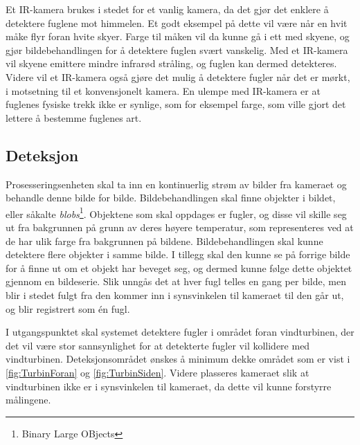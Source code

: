 Et IR-kamera brukes i stedet for et vanlig kamera, da det gjør det enklere å detektere fuglene mot himmelen. 
Et godt eksempel på dette vil være når en hvit måke flyr foran hvite skyer. 
Farge til måken vil da kunne gå i ett med skyene, og gjør bildebehandlingen for å detektere fuglen svært vanskelig. 
Med et IR-kamera vil skyene emittere mindre infrarød stråling, og fuglen kan dermed detekteres. 
Videre vil et IR-kamera også gjøre det mulig å detektere fugler når det er mørkt, i motsetning til et konvensjonelt kamera. 
En ulempe med IR-kamera er at fuglenes fysiske trekk ikke er synlige, som for eksempel farge, som ville gjort det lettere å bestemme fuglenes art. 

\subsection{Deteksjon}\label{sec:design:deteksjon}

Prosesseringsenheten skal ta inn en kontinuerlig strøm av bilder fra kameraet og behandle denne bilde for bilde. 
Bildebehandlingen skal finne objekter i bildet, eller såkalte \textit{blobs}\footnote{Binary Large OBjects}. 
Objektene som skal oppdages er fugler, og disse vil skille seg ut fra bakgrunnen på grunn av deres høyere temperatur, som representeres ved at de har ulik farge fra bakgrunnen på bildene. 
Bildebehandlingen skal kunne detektere flere objekter i samme bilde. 
I tillegg skal den kunne se på forrige bilde for å finne ut om et objekt har beveget seg, og dermed kunne følge dette objektet gjennom en bildeserie. 
Slik unngås det at hver fugl telles en gang per bilde, men blir i stedet fulgt fra den kommer inn i synsvinkelen til kameraet til den går ut, og blir registrert som én fugl.

I utgangspunktet skal systemet detektere fugler i området foran vindturbinen, der det vil være stor sannsynlighet for at detekterte fugler vil kollidere med vindturbinen. Deteksjonsområdet ønskes å minimum dekke området som er vist i \autoref{fig:TurbinForan} og \ref{fig:TurbinSiden}. 
Videre plasseres kameraet slik at vindturbinen ikke er i synsvinkelen til kameraet, da dette vil kunne forstyrre målingene.


